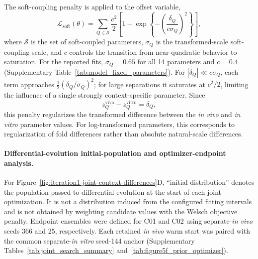 \documentclass[11pt]{article}
\begin{document}
The soft-coupling penalty is applied to the offset variable,
\begin{equation}
\mathcal L_{\mathrm{soft}}(\theta)
=
\sum_{Q\in\mathcal S}
\frac{c^2}{2}
\left[
1-\exp\!\left\{
-\left(\frac{\delta_Q}{c\sigma_Q}\right)^2
\right\}
\right],
\label{eq:appendix_joint_soft_penalty}
\end{equation}
where $\mathcal S$ is the set of soft-coupled parameters, $\sigma_Q$ is the transformed-scale soft-coupling scale, and $c$ controls the transition from near-quadratic behavior to saturation. For the reported fits, $\sigma_Q=0.65$ for all 14 parameters and $c=0.4$ (Supplementary Table~\ref{tab:model_fixed_parameters}). For $|\delta_Q|\ll c\sigma_Q$, each term approaches $\tfrac{1}{2}(\delta_Q/\sigma_Q)^2$; for large separations it saturates at $c^2/2$, limiting the influence of a single strongly context-specific parameter. Since
\[
z_Q^{\mathrm{vivo}}-z_Q^{\mathrm{vitro}}=\delta_Q,
\]
this penalty regularizes the transformed difference between the \textit{in vivo} and \textit{in vitro} parameter values. For log-transformed parameters, this corresponds to regularization of fold differences rather than absolute natural-scale differences.

\paragraph{Differential-evolution initial-population and optimizer-endpoint analysis.}
For Figure~\ref{fig:iteration1-joint-context-differences}D, ``initial distribution'' denotes the population passed to differential evolution at the start of each joint optimization. It is not a distribution induced from the configured fitting intervals and is not obtained by weighting candidate values with the Welsch objective penalty. Endpoint ensembles were defined for C01 and C02 using separate-\textit{in vivo} seeds 366 and 25, respectively. Each retained \textit{in vivo} warm start was paired with the common separate-\textit{in vitro} seed-144 anchor (Supplementary Tables~\ref{tab:joint_search_summary} and~\ref{tab:figure5f_prior_optimizer}).
\end{document}
